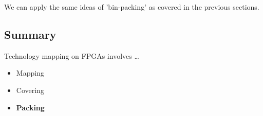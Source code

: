 \documentclass{article}
\begin{document}
We can apply the same ideas of 'bin-packing' as covered in the previous sections.

\subsection{Summary}
Technology mapping on FPGAs involves \dots
\begin{itemize}
    \item Mapping
    \item Covering
    \item \textbf{Packing}
\end{itemize}
\end{document}
